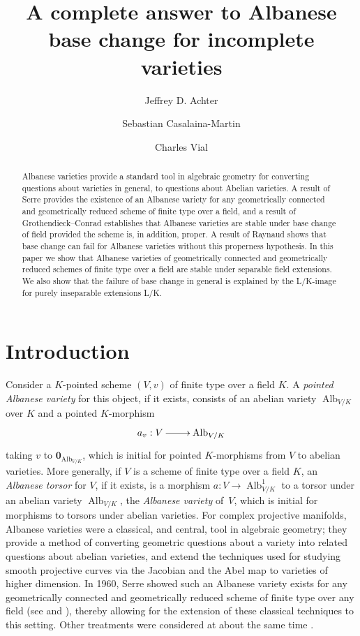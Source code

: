 \documentclass[11pt, reqno]{amsart}
\title{A complete answer to Albanese base change for  incomplete varieties}
\author{Jeffrey D. Achter}
\author{Sebastian Casalaina-Martin }
\author{Charles Vial}
\numberwithin{equation}{section}
\theoremstyle{definition}
\theoremstyle{remark}
\DeclareMathOperator{\alb}{Alb}
\begin{document}
\begin{abstract}
Albanese varieties provide a standard tool in algebraic geometry for converting questions about varieties in general, to questions about Abelian varieties.  A result of Serre provides the existence of an Albanese variety for any  geometrically connected and geometrically reduced scheme of finite type over a field, and a result of Grothendieck--Conrad establishes that Albanese varieties are stable under base change of field provided the scheme is, in addition, proper.   A result of Raynaud shows that base change can fail for Albanese varieties without this properness hypothesis.   In this paper we show that Albanese varieties of  geometrically connected and geometrically reduced schemes of finite type over a field are stable under separable field extensions.  We also show that the failure of base change in general is explained by the L/K-image for purely inseparable extensions L/K.  
\end{abstract}



  \maketitle
   
 
  \section*{Introduction}

  
Consider a $K$-pointed 
         scheme  $(V,v)$ of finite type over a field $K$.    A \emph{pointed
Albanese variety} for this object, if it exists, consists of an abelian variety
$\alb_{V/K}$ over $K$ and a pointed $K$-morphism $$\xymatrix{a_v: V \ar[r]& \alb_{V/K}}$$ taking $v$ to
$\mathbf{0}_{\operatorname{Alb}_{V/K}}$, which is initial for pointed $K$-morphisms from $V$ to abelian
varieties.  More generally, if $V$ is a
 scheme of finite type over a field $K$,
an \emph{Albanese torsor} for $V$, if it exists, is a morphism $a:V \to \alb^1_{V/K}$ to a torsor under an abelian variety $\alb_{V/K}$, the \emph{Albanese variety} of~$V$, which is initial for morphisms to torsors under abelian varieties.
For complex projective manifolds, Albanese varieties were 
a classical, and central, tool in algebraic geometry; they provide a
method of converting geometric questions about a variety into
related questions about abelian varieties, and extend the techniques
used for studying  smooth projective curves via the Jacobian and the
Abel map to varieties of higher dimension.    In 1960, Serre showed
such an Albanese variety  exists for any geometrically
connected and geometrically reduced scheme of finite type over any
field    \cite{serrealb} (see  and ),
thereby allowing for the extension of these classical techniques to
this setting.  Other   treatments were considered at about the same
time  \cite{NS52,Chevalley60}.  
\end{document}
